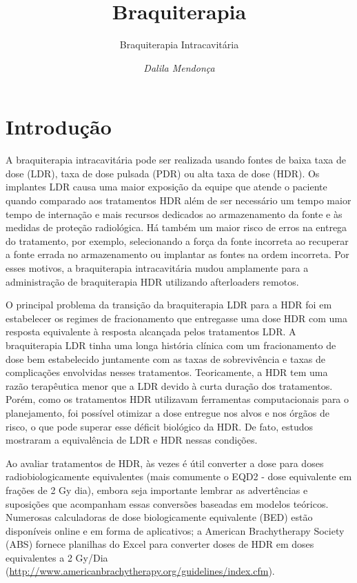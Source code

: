 \documentclass[11pt,a4paper]{article}
\title{\LobsterTwo\Huge{Braquiterapia}}
\author{\LobsterTwo\Large{Braquiterapia Intracavitária}\nocite{*}}
\date{\LobsterTwo\textit{Dalila Mendonça}}
\newcounter{exemplo}
\begin{document}
	\maketitle

\section{Introdução}

	A braquiterapia intracavitária pode ser realizada usando fontes de baixa taxa de dose (LDR), taxa de dose pulsada (PDR) ou alta taxa de dose (HDR). Os implantes LDR causa uma maior exposição da equipe que atende o paciente quando comparado aos tratamentos HDR além de ser necessário um tempo maior tempo de internação e mais recursos dedicados ao armazenamento da fonte e às medidas de proteção radiológica. Há também um maior risco de erros na entrega do tratamento, por exemplo, selecionando a força da fonte incorreta ao recuperar a fonte  errada no armazenamento ou implantar as fontes na ordem incorreta. Por esses motivos, a braquiterapia intracavitária mudou amplamente para a administração de braquiterapia HDR utilizando afterloaders remotos.

	O principal problema da transição da braquiterapia LDR para a HDR foi em estabelecer os regimes de fracionamento que entregasse uma dose HDR com uma resposta equivalente à resposta alcançada pelos tratamentos LDR. A braquiterapia LDR tinha uma longa história clínica com um fracionamento de dose bem estabelecido juntamente com as taxas de sobrevivência e taxas de complicações envolvidas nesses tratamentos. Teoricamente, a HDR tem uma razão terapêutica menor que a LDR devido à curta duração dos tratamentos. Porém, como os tratamentos HDR  utilizavam ferramentas computacionais para o planejamento, foi possível otimizar a dose entregue nos alvos e nos órgãos de risco, o que pode superar esse déficit biológico da HDR. De fato, estudos mostraram a equivalência de LDR e HDR nessas condições.

	Ao avaliar tratamentos de HDR, às vezes é útil converter a dose para doses radiobiologicamente equivalentes (mais comumente o EQD2 - dose equivalente em frações de 2 Gy dia), embora seja importante lembrar as advertências e suposições que acompanham essas conversões baseadas em modelos teóricos.  Numerosas calculadoras de dose biologicamente equivalente (BED) estão disponíveis online e em forma de aplicativos; a American Brachytherapy Society (ABS) fornece planilhas do Excel para converter doses de HDR em doses equivalentes a 2 Gy/Dia (\href{http://www.americanbrachytherapy.org/guidelines/index.cfm}{http://www.americanbrachytherapy.org/guidelines/index.cfm}).
\end{document}
